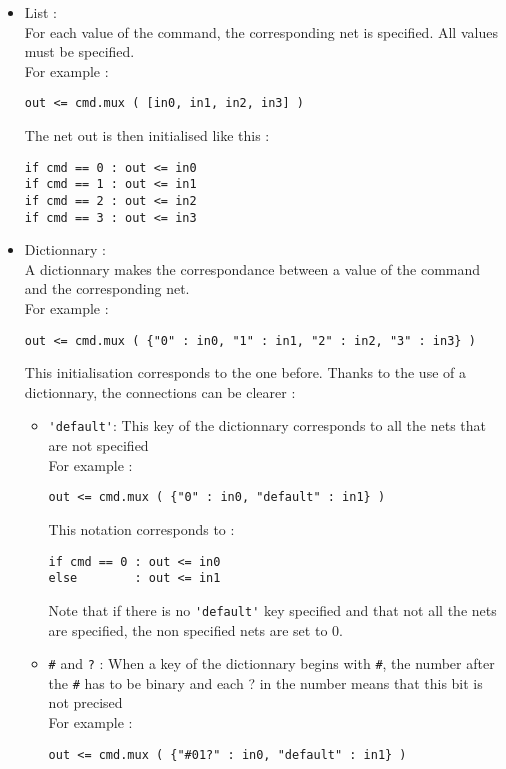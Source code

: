 \begin{itemize}
    \item List :\\
    \indent For each value of the command, the corresponding net is specified. All values must be specified.\\
    \indent For example :
    \begin{verbatim}
out <= cmd.mux ( [in0, in1, in2, in3] )
    \end{verbatim}
    \indent The net out is then initialised like this :
    \begin{verbatim}
if cmd == 0 : out <= in0
if cmd == 1 : out <= in1
if cmd == 2 : out <= in2
if cmd == 3 : out <= in3
    \end{verbatim}
    \item Dictionnary :\\
    \indent A dictionnary makes the correspondance between a value of the command and the corresponding net.\\
    \indent For example :
    \begin{verbatim}
out <= cmd.mux ( {"0" : in0, "1" : in1, "2" : in2, "3" : in3} )
    \end{verbatim}
    \indent This initialisation corresponds to the one before.
    \indent Thanks to the use of a dictionnary, the connections can be clearer :
    \begin{itemize}
        \item \verb-'default'-: This key of the dictionnary corresponds to all the nets that are not specified\\
        For example :
        \begin{verbatim}
out <= cmd.mux ( {"0" : in0, "default" : in1} )
        \end{verbatim}
        This notation corresponds to :
        \begin{verbatim}
if cmd == 0 : out <= in0
else        : out <= in1
        \end{verbatim}
        Note that if there is no \verb-'default'- key specified and that not all the nets are specified, the non specified nets are set to 0.
        \item \verb-#- and \verb-?- : When a key of the dictionnary begins with \verb-#-, the number after the \verb-#- has to be binary and each ? in the number means that this bit is not precised\\
        For example :
        \begin{verbatim}
out <= cmd.mux ( {"#01?" : in0, "default" : in1} )

\end{verbatim}
\end{itemize}
\end{itemize}
